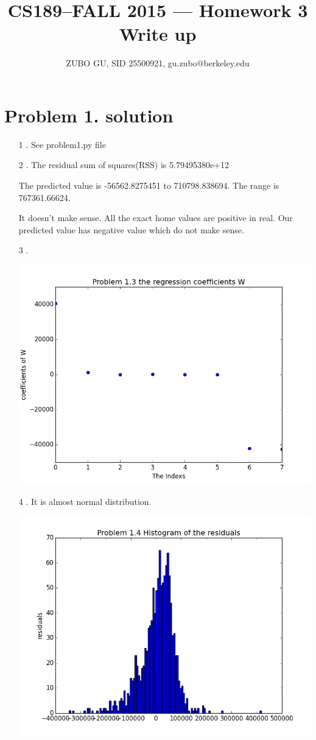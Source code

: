 \documentclass[11pt]{article}
\title{CS189--FALL 2015 --- Homework 3 Write up}
\author{ZUBO GU, SID 25500921, gu.zubo@berkeley.edu}
\date{}
\begin{document}
\maketitle

\section*{Problem 1. solution}

\begin{itemize}
\item[1].
See problem1.py file

\item[2].
The residual sum of squares(RSS) is 5.79495380e+12

The predicted value is  -56562.8275451 to 710798.838694. The range is  767361.66624.

It doesn't make sense. All the exact home values are positive in real. Our predicted value has negative value which do not make sense.

\item[3]. 

\includegraphics[scale=0.8]{1}

\newpage
\item[4]. 
It is almost normal distribution.

\includegraphics[scale=0.8]{2}

\end{itemize}
\end{document}
